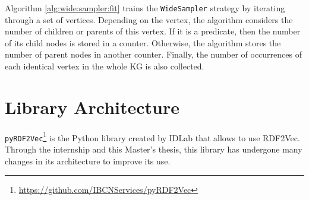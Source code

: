 Algorithm \ref{alg:wide:sampler:fit} trains the \texttt{WideSampler} strategy by
iterating through a set of vertices. Depending on the vertex, the algorithm
considers the number of children or parents of this vertex. If it is a
predicate, then the number of its child nodes is stored in a counter. Otherwise,
the algorithm stores the number of parent nodes in another counter. Finally, the
number of occurrences of each identical vertex in the whole KG is also
collected.

\section{Library Architecture}
\label{sec:pyRDF2Vec}

\texttt{pyRDF2Vec}\footnote{\url{https://github.com/IBCNServices/pyRDF2Vec}} is
the Python library created by IDLab that allows to use RDF2Vec. Through the
internship and this Master's thesis, this library has undergone many changes in
its architecture to improve its use.
